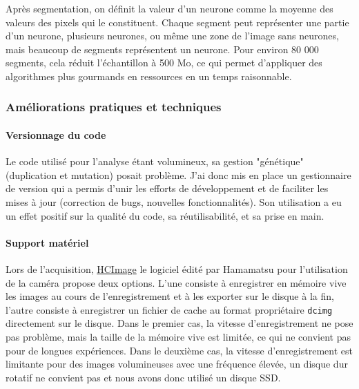 
Après segmentation, on définit la valeur d'un neurone comme la moyenne des valeurs des pixels qui le constituent. Chaque segment peut représenter une partie d'un neurone, plusieurs neurones, ou même une zone de l'image sans neurones, mais beaucoup de segments représentent un neurone. Pour environ 80 000 segments, cela réduit l'échantillon à 500 Mo, ce qui permet d'appliquer des algorithmes plus gourmands en ressources en un temps raisonnable.




\subsubsection{Améliorations pratiques et techniques}

\paragraph{Versionnage du code}
Le code utilisé pour l'analyse étant volumineux, sa gestion "génétique" (duplication et mutation) posait problème. J'ai donc mis en place un gestionnaire de version qui a permis d'unir les efforts de développement et de faciliter les mises à jour (correction de bugs, nouvelles fonctionnalités). Son utilisation a eu un effet positif sur la qualité du code, sa réutilisabilité, et sa prise en main. 

\paragraph{Support matériel}
Lors de l'acquisition, \href{https://hcimage.com/}{HCImage} le logiciel édité par Hamamatsu pour l'utilisation de la caméra propose deux options. L'une consiste à enregistrer en mémoire vive les images au cours de l'enregistrement et à les exporter sur le disque à la fin, l'autre consiste à enregistrer un fichier de cache au format propriétaire \verb|dcimg| directement sur le disque. Dans le premier cas, la vitesse d'enregistrement ne pose pas problème, mais la taille de la mémoire vive est limitée, ce qui ne convient pas pour de longues expériences. Dans le deuxième cas, la vitesse d'enregistrement est limitante pour des images volumineuses avec une fréquence élevée, un disque dur rotatif ne convient pas et nous avons donc utilisé un disque SSD.

